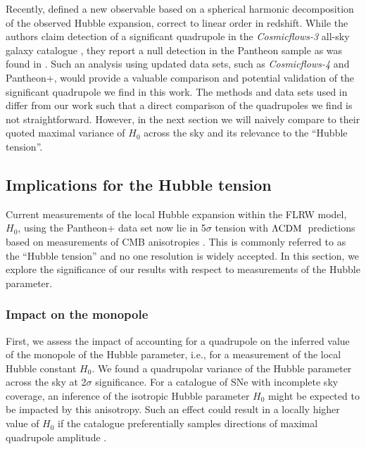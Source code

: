 \documentclass[fleqn,usenatbib]{mnras}
\newcommand{\lcdm}{$\Lambda\rm{CDM}$} %
\begin{document}
{Recently, \citet{Kalbouneh:2022tfw} defined a new observable based on a spherical harmonic decomposition of 
the observed Hubble expansion, correct to linear order in redshift. While the authors claim detection of a significant quadrupole in the \textit{Cosmicflows-3} all-sky galaxy catalogue \citep{CF3}, they report a null detection in the Pantheon sample \citep{pantheon_2018} as was found in . Such an analysis using updated data sets, such as \textit{Cosmicflows-4} \citep{CF4} and Pantheon+, would provide a valuable comparison and potential validation of the significant quadrupole we find in this work. The methods and data sets used in \citet{Kalbouneh:2022tfw} differ from our work such that a direct comparison of the quadrupoles we find is not straightforward. However, in the next section we will naively compare to their quoted maximal variance of $H_0$ across the sky and its relevance to the ``Hubble tension''. 
}



\subsection{Implications for the Hubble tension}\label{sec:Htension}

{Current measurements of the local Hubble expansion within the FLRW model, $H_0$,} using the Pantheon+ data set now lie in 5$\sigma$ tension with \lcdm\ predictions based on measurements of CMB anisotropies \citep{Riess_2022,aghanim2020planck}. {This is commonly referred to as the ``Hubble tension'' and no one resolution is widely accepted. }
In this section, we explore the significance of our {results with respect to measurements of the Hubble parameter}. 

\subsubsection{Impact on the monopole}

First, we assess the impact of accounting for a quadrupole on
the inferred value of the monopole of the Hubble parameter, i.e., for a measurement of the local Hubble constant $H_0$.  
We found a quadrupolar variance of the Hubble parameter across the sky at 2$\sigma$ significance. 
For a catalogue of SNe with incomplete sky coverage, an inference of the isotropic Hubble parameter $H_0$ might be expected to be impacted by this anisotropy. {Such an effect could result in a locally higher value of $H_0$ if the catalogue preferentially samples directions of maximal quadrupole amplitude \citep[see also][for a discussion on this]{Macpherson_Heinesen_2021}.}
\end{document}
